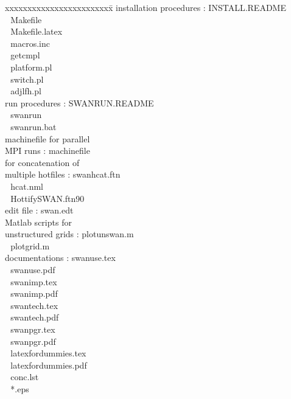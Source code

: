\documentclass[12pt]{book}
\begin{document}
\begin{tabbing}
xxxxxxxxxxxxxxxxxxxxxxxx\= \kill
installation procedures   \>:       INSTALL.README \\
                          \> $\,\,$ Makefile \\
                          \> $\,\,$ Makefile.latex \\
                          \> $\,\,$ macros.inc \\
                          \> $\,\,$ getcmpl \\
                          \> $\,\,$ platform.pl \\
                          \> $\,\,$ switch.pl \\
                          \> $\,\,$ adjlfh.pl \\
run procedures            \>:       SWANRUN.README \\
                          \> $\,\,$ swanrun \\
                          \> $\,\,$ swanrun.bat \\
machinefile for parallel  \> $\,\,$ \\
MPI runs                  \>:       machinefile \\
for concatenation of      \> $\,\,$ \\
multiple hotfiles         \>:       swanhcat.ftn \\
                          \> $\,\,$ hcat.nml \\
                          \> $\,\,$ HottifySWAN.ftn90 \\
edit file                 \>:       swan.edt \\
Matlab scripts for        \> $\,\,$ \\
unstructured grids        \>:       plotunswan.m \\
                          \> $\,\,$ plotgrid.m \\
documentations            \>:       swanuse.tex \\
                          \> $\,\,$ swanuse.pdf \\
                          \> $\,\,$ swanimp.tex \\
                          \> $\,\,$ swanimp.pdf \\
                          \> $\,\,$ swantech.tex \\
                          \> $\,\,$ swantech.pdf \\
                          \> $\,\,$ swanpgr.tex \\
                          \> $\,\,$ swanpgr.pdf \\
                          \> $\,\,$ latexfordummies.tex \\
                          \> $\,\,$ latexfordummies.pdf \\
                          \> $\,\,$ conc.lst \\
                          \> $\,\,$ *.eps \\
\end{tabbing}
\end{document}
